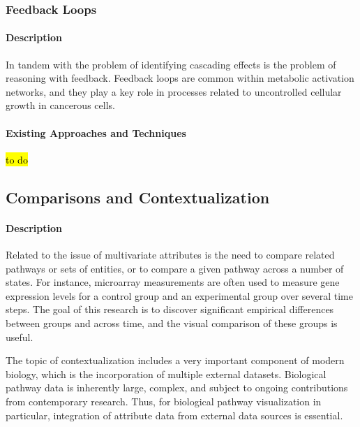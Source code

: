 
\subsubsection*{Feedback Loops}

\paragraph*{Description}

In tandem with the problem of identifying cascading effects is the problem of reasoning with feedback.
Feedback loops are common within metabolic activation networks, and they play a key role in processes related to uncontrolled cellular growth in cancerous cells.

\paragraph*{Existing Approaches and Techniques}

\hl{to do}

\subsection*{Comparisons and Contextualization}

\paragraph*{Description}

Related to the issue of multivariate attributes is the need to compare related pathways or sets of entities, or to compare a given pathway across a number of states.
For instance, microarray measurements are often used to measure gene expression levels for a control group and an experimental group over several time steps.
The goal of this research is to discover significant empirical differences between groups and across time, and the visual comparison of these groups is useful.

The topic of contextualization includes a very important component of modern biology, which is the incorporation of multiple external datasets.
Biological pathway data is inherently large, complex, and subject to ongoing contributions from contemporary research.
Thus, for biological pathway visualization in particular, integration of attribute data from external data sources is essential.

